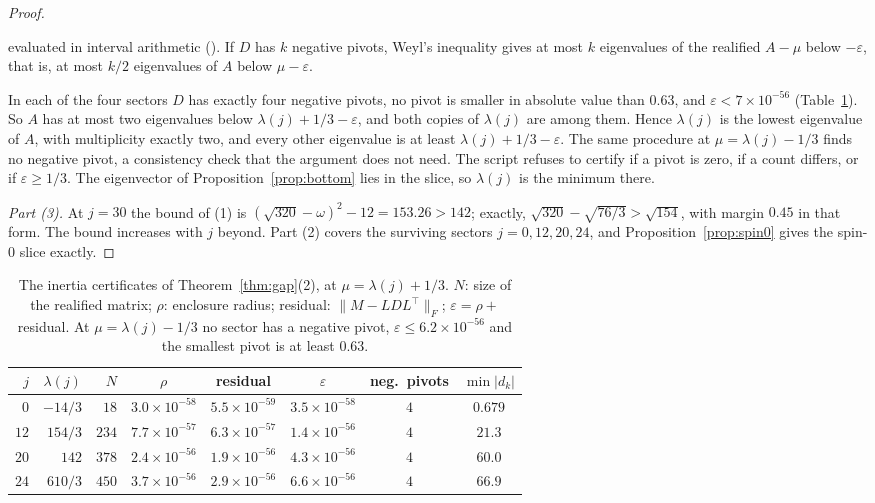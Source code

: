 \documentclass[11pt]{article}
\theoremstyle{definition}
\theoremstyle{remark}
\newcommand{\norm}[1]{\lVert #1\rVert}
\begin{document}
\begin{proof}
\begin{enumerate}
    evaluated in interval arithmetic (). If $D$ has $k$
    negative pivots, Weyl's inequality gives at most $k$ eigenvalues of the realified $A-\mu$ below
    $-\varepsilon$, that is, at most $k/2$ eigenvalues of $A$ below $\mu-\varepsilon$.
\end{enumerate}
In each of the four sectors $D$ has exactly four negative pivots, no pivot is smaller in absolute value
than $0.63$, and $\varepsilon<7\times10^{-56}$ (Table~\ref{tab:cert}). So $A$ has at most two
eigenvalues below $\lambda(j)+1/3-\varepsilon$, and both copies of $\lambda(j)$ are among them. Hence
$\lambda(j)$ is the lowest eigenvalue of $A$, with multiplicity exactly two, and every other eigenvalue is
at least $\lambda(j)+1/3-\varepsilon$. The same procedure at $\mu=\lambda(j)-1/3$ finds no negative pivot,
a consistency check that the argument does not need. The script refuses to certify if a pivot is zero, if
a count differs, or if $\varepsilon\ge1/3$. The eigenvector of Proposition~\ref{prop:bottom} lies in the
slice, so $\lambda(j)$ is the minimum there.

\emph{Part (3).} At $j=30$ the bound of (1) is $(\sqrt{320}-\omega)^2-12=153.26>142$; exactly,
$\sqrt{320}-\sqrt{76/3}>\sqrt{154}$, with margin $0.45$ in that form. The bound increases with $j$
beyond. Part (2) covers the surviving sectors $j=0,12,20,24$, and
Proposition~\ref{prop:spin0} gives the spin-$0$ slice exactly.
\end{proof}

\begin{table}[t]\centering\small
\caption{The inertia certificates of Theorem~\ref{thm:gap}(2), at $\mu=\lambda(j)+1/3$. $N$: size of the
realified matrix; $\rho$: enclosure radius; residual: $\norm{M-LDL^\top}_F$; $\varepsilon=\rho+{}$residual. At $\mu=\lambda(j)-1/3$ no sector has a negative pivot,
$\varepsilon\le6.2\times10^{-56}$ and the smallest pivot is at least $0.63$.}
\label{tab:cert}
\begin{tabular}{rrrccccc}\toprule
$j$ & $\lambda(j)$ & $N$ & $\rho$ & residual & $\varepsilon$ & neg.\ pivots & $\min|d_k|$ \\ \midrule
$0$ & $-14/3$ & $18$ & $3.0\times10^{-58}$ & $5.5\times10^{-59}$ & $3.5\times10^{-58}$ & $4$ & $0.679$ \\
$12$ & $154/3$ & $234$ & $7.7\times10^{-57}$ & $6.3\times10^{-57}$ & $1.4\times10^{-56}$ & $4$ & $21.3$ \\
$20$ & $142$ & $378$ & $2.4\times10^{-56}$ & $1.9\times10^{-56}$ & $4.3\times10^{-56}$ & $4$ & $60.0$ \\
$24$ & $610/3$ & $450$ & $3.7\times10^{-56}$ & $2.9\times10^{-56}$ & $6.6\times10^{-56}$ & $4$ & $66.9$ \\
\bottomrule\end{tabular}
\end{table}
\end{document}
